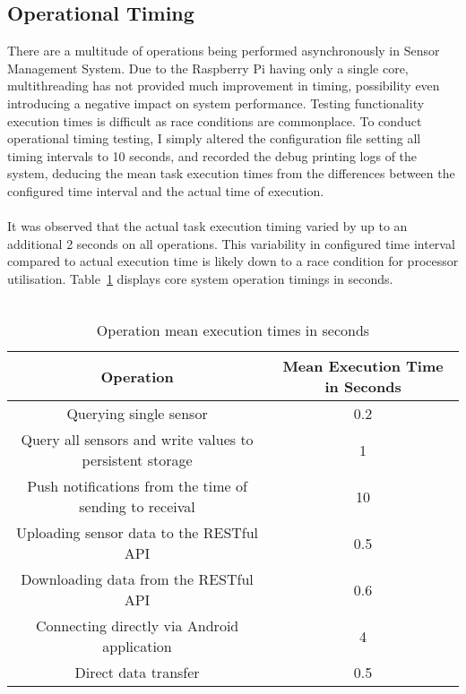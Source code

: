 \documentclass{article}
\begin{document}
\subsection{Operational Timing}
There are a multitude of operations being performed asynchronously in Sensor Management System. Due to the Raspberry Pi having only a single core, multithreading has not provided much improvement in timing, possibility even introducing a negative impact on system performance. Testing functionality execution times is difficult as race conditions are commonplace. To conduct operational timing testing, I simply altered the configuration file setting all timing intervals to 10 seconds, and recorded the debug printing logs of the system, deducing the mean task execution times from the differences between the configured time interval and the actual time of execution. \\\\
It was observed that the actual task execution timing varied by up to an additional 2 seconds on all operations. This variability in configured time interval compared to actual execution time is likely down to a race condition for processor utilisation. Table~\ref{table:testing_op_timings} displays core system operation timings in seconds. \\\\

\begin{table}[H]
\def\arraystretch{2}%
\begin{center}
 \begin{tabular}{|| c | c ||} 
 \hline
 \textbf{Operation} & \textbf{Mean Execution Time in Seconds}  \\ [0.5ex] 
 \hline\hline
 Querying single sensor & 0.2 \\ 
 \hline
 Query all sensors and write values to persistent storage & 1 \\
 \hline
 Push notifications from the time of sending to receival & 10 \\
 \hline
 Uploading sensor data to the RESTful API & 0.5 \\ [1ex] 
 \hline
 Downloading data from the RESTful API & 0.6 \\ [1ex] 
 \hline
 Connecting directly via Android application & 4 \\ [1ex] 
 \hline
 Direct data transfer & 0.5 \\ [1ex] 
 \hline
 
\end{tabular}
\end{center}
\caption{Operation mean execution times in seconds}
\label{table:testing_op_timings}
\end{table}
\end{document}
